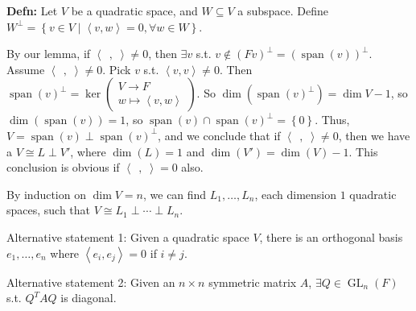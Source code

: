 \documentclass[10pt,letterpaper]{article}
\newcommand{\n}{\hfill\break}
\newcommand{\hangblock}[2]{\par\noindent\settowidth{\hangindent}{\textbf{#1: }}\textbf{#1: }\!\!\!#2}
\newcommand{\defn}[1]{\hangblock{Defn}{#1}}
\newcommand{\set}[1]{\left\{#1\right\}}
\newcommand{\tpose}{^{T}\!}
\newcommand{\iprod}[1]{\left<#1\right>}
\newcommand{\giprod}{\iprod{\;\,,\;}}
\DeclareMathOperator{\GL}{GL}
\DeclareMathOperator{\vspan}{span}
\newcommand{\st}{s.t.}
\newcommand{\paren}[1]{\left(#1\right)}
\begin{document}
\defn{
	Let $V$ be a quadratic space, and $W\subseteq{}V$ a subspace. Define $W^{\perp}=\set{v\in{}V\mid{}\iprod{v,w}=0,\forall{}w\in{}W}$.\n
}

\par\noindent
By our lemma, if $\giprod\ne{}0$, then $\exists{}v$ \st{} $v\not\in(Fv)^{\perp}=(\vspan(v))^{\perp}$.\n
Assume $\giprod\ne{}0$. Pick $v$ \st{} $\iprod{v,v}\ne{}0$. Then $\vspan(v)^{\perp}=\ker\paren{\begin{array}{l}V\to{}F\\ w\mapsto\iprod{v,w}\end{array}}$.\n
So $\dim(\vspan(v)^{\perp})=\dim{}V-1$, so $\dim(\vspan(v))=1$, so $\vspan(v)\cap\vspan(v)^{\perp}=\set{0}$.\n
Thus, $V=\vspan(v)\perp\vspan(v)^{\perp}$, and we conclude that if $\giprod\ne0$, then we have a $V\cong{}L\perp{}V'$, where $\dim(L)=1$ and $\dim(V')=\dim(V)-1$. This conclusion is obvious if $\giprod=0$ also.\n

\par\noindent
By induction on $\dim{}V=n$, we can find $L_{1},\ldots,L_{n}$, each dimension $1$ quadratic spaces, such that\n
$V\cong{}L_{1}\perp\cdots\perp{}L_{n}$.\n

\par\noindent
Alternative statement 1: Given a quadratic space $V$, there is an orthogonal basis $e_{1},\ldots,e_{n}$ where\n
$\iprod{e_{i},e_{j}}=0$ if $i\ne{}j$.\n

\par\noindent
Alternative statement 2: Given an $n\times{}n$ symmetric matrix $A$, $\exists{}Q\in\GL_{n}(F)$ \st{} $Q\tpose{}AQ$ is diagonal.\n
\end{document}
